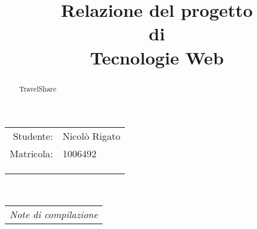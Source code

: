 \documentclass[10 pt,a4paper, openany]{article}
\title{Relazione del progetto\\di\\Tecnologie Web}
\date{}
\begin{document}
\maketitle
\begin{center}
  \begin{tabular}{r l}
    Studente: & Nicolò Rigato \\
    Matricola: & 1006492 \\ \\\\\\
  \end{tabular}
  \\
  \begin{tabular}{c}
    \emph{Note di compilazione} \\
    
  \end{tabular}
\end{center}

\begin{abstract}
TravelShare
\end{abstract}
\end{document}
